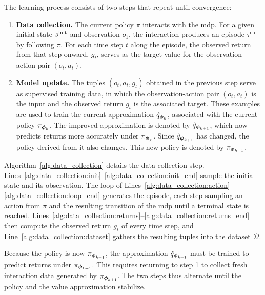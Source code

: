 

The learning process consists of two steps that repeat until convergence:
\begin{enumerate}
    \item \textbf{Data collection.} The current policy \(\pi\) interacts with the \gls{mdp}.
    For a given initial state \(s^{\mathrm{init}}\) and observation \(o_1\), the interaction produces an episode \(\tau^{\mathrm{ep}}\) by following \(\pi\).
    For each time step \(t\) along the episode, the observed return from that step onward, \(g_t\), serves as the target value for the observation-action pair \((o_t, a_t)\).

    \item \textbf{Model update.} The tuples \((o_t, a_t, g_t)\) obtained in the previous step serve as supervised training data, in which the observation-action pair \((o_t, a_t)\) is the input and the observed return \(g_t\) is the associated target.
    These examples are used to train the current approximation \(\hat{q}_{\boldsymbol{\phi}_k}\), associated with the current policy \(\pi_{\boldsymbol{\phi}_k}\).
    The improved approximation is denoted by \(\hat{q}_{\boldsymbol{\phi}_{k+1}}\), which now predicts returns more accurately under \(\pi_{\boldsymbol{\phi}_k}\). Since \(\hat{q}_{\boldsymbol{\phi}_{k+1}}\) has changed, the policy derived from it also changes.
    This new policy is denoted by \(\pi_{\boldsymbol{\phi}_{k+1}}\).
\end{enumerate}

Algorithm~\ref{alg:data_collection} details the data collection step.
Lines~\ref{alg:data_collection:init}--\ref{alg:data_collection:init_end} sample the initial state and its observation.
The loop of Lines~\ref{alg:data_collection:action}--\ref{alg:data_collection:loop_end} generates the episode, each step sampling an action from \(\pi\) and the resulting transition of the \gls{mdp} until a terminal state is reached.
Lines~\ref{alg:data_collection:returns}--\ref{alg:data_collection:returns_end} then compute the observed return \(g_t\) of every time step, and Line~\ref{alg:data_collection:dataset} gathers the resulting tuples into the dataset \(\mathcal{D}\).

Because the policy is now \(\pi_{\boldsymbol{\phi}_{k+1}}\), the approximation \(\hat{q}_{\boldsymbol{\phi}_{k+1}}\) must be trained to predict returns under \(\pi_{\boldsymbol{\phi}_{k+1}}\). This requires returning to step 1 to collect fresh interaction data generated by \(\pi_{\boldsymbol{\phi}_{k+1}}\). The two steps thus alternate until the policy and the value approximation stabilize.

